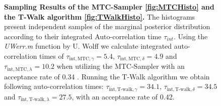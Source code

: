 \begin{figure}[thb]
	\centering
\caption[Sampling Results of the MTC-Sampler and the T-Walk algorithm \ref{fig:TWalkHisto}]{\textbf{Sampling Results of the MTC-Sampler \ref{fig:MTCHisto} and the T-Walk algorithm \ref{fig:TWalkHisto}.} The histograms present independent samples of the marginal posterior distribution according to their integrated Auto-correlation time $\tau_{int}$.
Using the \textit{UWerr.m} function by U. Wolff we calculate integrated auto-correlation times of $\tau_{\text{int}, \text{MTC}, \gamma} = 5.4$, $\tau_{\text{int}, \text{MTC}, \delta} = 4.9$ and $\tau_{\text{int}, \text{MTC}, \lambda}= 10.2$ when utilizing the MTC-Sampler with an acceptance rate of 0.34 \cite{Uwerr}.
Running the T-Walk algorithm we obtain following auto-correlation times: $\tau_{\text{int}, \text{T-walk}, \gamma} = 34.1$, $\tau_{\text{int}, \text{T-walk}, \delta} = 34.5$ and $\tau_{\text{int}, \text{T-walk}, \lambda}= 27.5$, with an acceptance rate of 0.42.}
\label{fig:histRes}
\end{figure}
